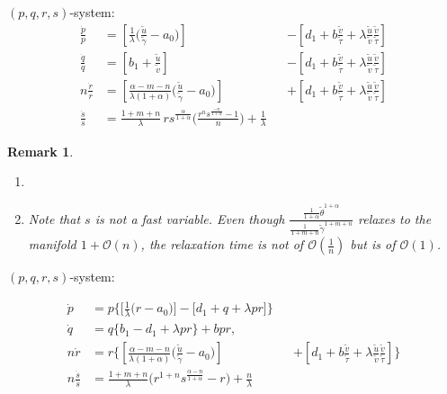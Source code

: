 \documentclass[a4paper,11pt]{article}
\def\tg{{\tilde{\gamma}}}
\def\tv{{\tilde{v}}}
\def\tth{{\tilde{\theta}}}
\def\ts{{\tilde{\tau}}}
\def\tu{{\tilde{u}}}
\def\dpp{\dot{p}}
\def\dqq{\dot{q}}
\def\drr{\dot{r}}
\newtheorem{remark}{Remark}[section]
\begin{document}
$(p,q,r,s)$-system:
\begin{align*}
 \frac{\dpp}{p}&=\left[\frac{1}{\lambda }\Big(\frac{\tu}{\tg}-a_0\Big)\right] & &-\left[d_1 + b\frac{\tv}{\ts} + \lambda\frac{\tu}{\tv}\frac{\tv}{\ts}\right]\\
 \frac{\dqq}{q}&=\left[b_1 +\frac{\tu}{\tv}\right] & &-\left[d_1 + b\frac{\tv}{\ts} + \lambda\frac{\tu}{\tv}\frac{\tv}{\ts}\right]\\
 n\frac{\drr}{r}&=\left[\frac{\alpha-m-n}{\lambda(1+\alpha) }\Big(\frac{\tu}{\tg}-a_0\Big)\right]& &+\left[d_1 + b\frac{\tv}{\ts} + \lambda\frac{\tu}{\tv}\frac{\tv}{\ts}\right]\\
 \frac{\dot{s}}{s} &= \frac{1+m+n}{\lambda}\,rs^{\frac{\alpha}{1+\alpha}}\Big(\frac{r^{n}s^{\frac{-n}{1+\alpha}} - 1}{n} \Big) + \frac{1}{\lambda}
\end{align*}

\begin{remark}
 \begin{enumerate}
  \item 
  \item Note that $s$ is not a fast variable. Even though $\displaystyle\frac{ \frac{1}{1+\alpha} \tth^{1+\alpha} }{ \frac{1}{1+m+n} \tg^{1+m+n} }$ relaxes to the manifold $1 + \mathcal{O}(n)$, the relaxation time is not of $\mathcal{O}(\frac{1}{n})$ but is of $\mathcal{O}(1)$.
  
 \end{enumerate}
\end{remark}



$(p,q,r,s)$-system:

\begin{equation}
\begin{aligned}
  {\dpp}&=p\bigg\{\Big[\frac{1}{\lambda }\Big(r-a_0\Big)\Big] -\Big[d_1 + q + \lambda p r\Big]\bigg\}\\
  {\dqq}&=q\bigg\{b_1-d_1 + \lambda p r\bigg\} +bpr,\\
 n{\drr}&=r\bigg\{\left[\frac{\alpha-m-n}{\lambda(1+\alpha) }\Big(\frac{\tu}{\tg}-a_0\Big)\right]& &+\left[d_1 + b\frac{\tv}{\ts} + \lambda\frac{\tu}{\tv}\frac{\tv}{\ts}\right]\bigg\}\\
 n\frac{\dot{s}}{s} &= \frac{1+m+n}{\lambda}\Big(r^{1+n}s^{\frac{\alpha-n}{1+\alpha}} - r \Big) + \frac{n}{\lambda}
\end{aligned}
\end{equation}
\end{document}
